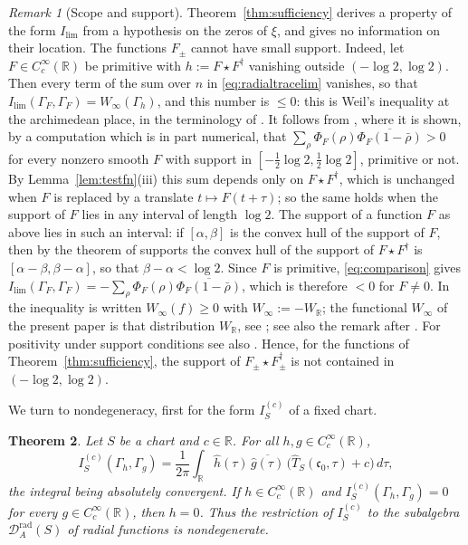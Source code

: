 \documentclass[11pt]{amsart}
\newtheorem{theorem}{Theorem}[section]
\theoremstyle{remark}
\newtheorem{remark}[theorem]{Remark}
\numberwithin{equation}{section}
\newcommand{\R}{\mathbb R}
\newcommand{\DAr}{\mathcal D_A^{\mathrm{rad}}}
\newcommand{\cz}{\mathfrak c_0}
\newcommand{\Il}{I_{\lim}}
\begin{document}
\begin{remark}[Scope and support]
\label{rem:support}
Theorem~\ref{thm:sufficiency} derives a property of the form $\Il$ from a
hypothesis on the zeros of $\xi$, and gives no information on their
location.  The functions $F_\pm$ cannot have small support.  Indeed, let
$F\in C_c^\infty(\R)$ be primitive with $h:=F\star F^\dagger$ vanishing
outside $(-\log2,\log2)$.  Then every term of the sum over $n$ in
\eqref{eq:radialtracelim} vanishes, so that
$\Il(\Gamma_F,\Gamma_F)=W_\infty(\Gamma_h)$, and this number is $\le0$: this
is Weil's inequality at the archimedean place, in the terminology of
\cite[Introduction]{CCWeilArch}.  It follows from
\cite[Theorem~1]{Yoshida}, where it is shown, by a computation which is in
part numerical, that
$\sum_\rho\Phi_F(\rho)\overline{\Phi_F(1-\bar\rho)}>0$ for every nonzero
smooth $F$ with support in $[-\tfrac12\log2,\tfrac12\log2]$, primitive or
not.  By Lemma~\ref{lem:testfn}(iii) this sum depends only on
$F\star F^\dagger$, which is unchanged when $F$ is replaced by a translate
$t\mapsto F(t+\tau)$; so the same holds when the support of $F$ lies in any
interval of length $\log2$.  The support of a function $F$ as above lies in
such an interval: if $[\alpha,\beta]$ is the convex hull of the support of
$F$, then by the theorem of supports \cite[Theorem~4.3.3]{Hormander} the
convex hull of the support of $F\star F^\dagger$ is
$[\alpha-\beta,\beta-\alpha]$, so that $\beta-\alpha<\log2$.  Since $F$ is
primitive, \eqref{eq:comparison} gives
$\Il(\Gamma_F,\Gamma_F)=-\sum_\rho\Phi_F(\rho)\overline{\Phi_F(1-\bar\rho)}$,
which is therefore $<0$ for $F\ne0$.  In \cite{CCWeilArch} the inequality is
written $W_\infty(f)\ge0$ with $W_\infty:=-W_\R$; the functional $W_\infty$
of the present paper is that distribution $W_\R$, see
\cite[Section~5, after Convention~5.5]{P43}; see also the remark after
\cite[Theorem~6.18]{P43}.  For positivity under support conditions see also
\cite{Bombieri,BurnolCR}.  Hence, for the functions of
Theorem~\ref{thm:sufficiency}, the support of $F_\pm\star F_\pm^\dagger$ is
not contained in $(-\log2,\log2)$.
\end{remark}

We turn to nondegeneracy, first for the form $I^{(c)}_S$ of a fixed chart.

\begin{theorem}
\label{thm:radical}
Let $S$ be a chart and $c\in\R$.  For all $h,g\in C_c^\infty(\R)$,
\begin{equation}
\label{eq:radform}
  I^{(c)}_S(\Gamma_h,\Gamma_g)
  =\frac1{2\pi}\int_\R\hat h(\tau)\,\overline{\hat g(\tau)}\,
     \bigl(\widehat T_S(\cz,\tau)+c\bigr)\,d\tau ,
\end{equation}
the integral being absolutely convergent.  If $h\in C_c^\infty(\R)$ and
$I^{(c)}_S(\Gamma_h,\Gamma_g)=0$ for every $g\in C_c^\infty(\R)$, then $h=0$.
Thus the restriction of $I^{(c)}_S$ to the subalgebra $\DAr(S)$ of radial
functions is nondegenerate.
\end{theorem}
\end{document}
